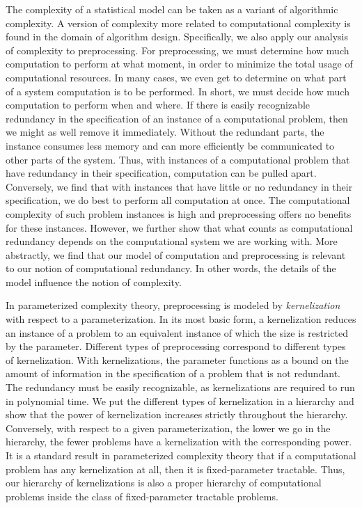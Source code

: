 The complexity of a statistical model can be taken as a variant of algorithmic complexity.
A version of complexity more related to computational complexity is found in the domain of algorithm design.
Specifically, we also apply our analysis of complexity to preprocessing.
For preprocessing, we must determine how much computation to perform at what moment, in order to minimize the total usage of computational resources.
In many cases, we even get to determine on what part of a system computation is to be performed.
In short, we must decide how much computation to perform when and where.
If there is easily recognizable redundancy in the specification of an instance of a computational problem, then we might as well remove it immediately.
Without the redundant parts, the instance consumes less memory and can more efficiently be communicated to other parts of the system.
Thus, with instances of a computational problem that have redundancy in their specification, computation can be pulled apart.
Conversely, we find that with instances that have little or no redundancy in their specification, we do best to perform all computation at once.
The computational complexity of such problem instances is high and preprocessing offers no benefits for these instances.
However, we further show that what counts as computational redundancy depends on the computational system we are working with.
More abstractly, we find that our model of computation and preprocessing is relevant to our notion of computational redundancy.
In other words, the details of the model influence the notion of complexity.

In parameterized complexity theory, preprocessing is modeled by \emph{kernelization} with respect to a parameterization.
In its most basic form, a kernelization reduces an instance of a problem to an equivalent instance of which the size is restricted by the parameter.
Different types of preprocessing correspond to different types of kernelization.
With kernelizations, the parameter functions as a bound on the amount of information in the specification of a problem that is not redundant.
The redundancy must be easily recognizable, as kernelizations are required to run in polynomial time.
We put the different types of kernelization in a hierarchy and show that the power of kernelization increases strictly throughout the hierarchy.
Conversely, with respect to a given parameterization, the lower we go in the hierarchy, the fewer problems have a kernelization with the corresponding power.
It is a standard result in parameterized complexity theory that if a computational problem has any kernelization at all, then it is fixed-parameter tractable.
Thus, our hierarchy of kernelizations is also a proper hierarchy of computational problems inside the class of fixed-parameter tractable problems.

